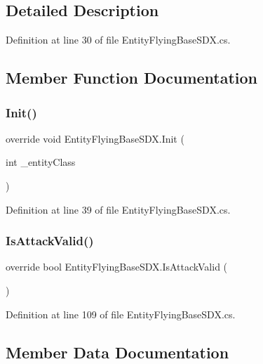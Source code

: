 \subsection{Detailed Description}


Definition at line 30 of file Entity\+Flying\+Base\+S\+D\+X.\+cs.



\subsection{Member Function Documentation}
\mbox{\label{class_entity_flying_base_s_d_x_a4d523276acced698e348d07b6761535e}} 
\subsubsection{\texorpdfstring{Init()}{Init()}}
{\footnotesize\ttfamily override void Entity\+Flying\+Base\+S\+D\+X.\+Init (\begin{DoxyParamCaption}\item[{int}]{\+\_\+entity\+Class }\end{DoxyParamCaption})}



Definition at line 39 of file Entity\+Flying\+Base\+S\+D\+X.\+cs.

\mbox{\label{class_entity_flying_base_s_d_x_a2208d036acaab6140efce0eb7774401a}} 
\subsubsection{\texorpdfstring{IsAttackValid()}{IsAttackValid()}}
{\footnotesize\ttfamily override bool Entity\+Flying\+Base\+S\+D\+X.\+Is\+Attack\+Valid (\begin{DoxyParamCaption}{ }\end{DoxyParamCaption})}



Definition at line 109 of file Entity\+Flying\+Base\+S\+D\+X.\+cs.



\subsection{Member Data Documentation}
\mbox{\label{class_entity_flying_base_s_d_x_a6090bff9248f106e95097b0ab526b60b}} 
